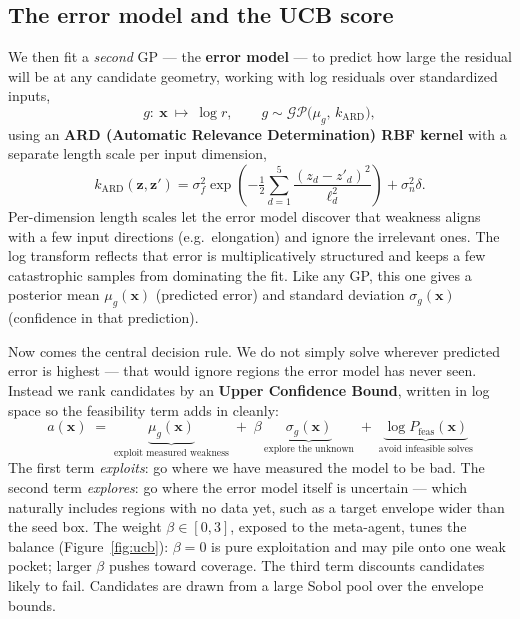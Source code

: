 \documentclass[11pt]{article}
\newcommand{\bx}{\mathbf{x}}
\newcommand{\bz}{\mathbf{z}}
\newcommand{\GP}{\mathcal{GP}}
\begin{document}
\subsection{The error model and the UCB score}
We then fit a \emph{second} GP --- the \textbf{error model} --- to predict how large the residual
will be at any candidate geometry, working with log residuals over standardized inputs,
\begin{equation}
g:\ \bx\ \longmapsto\ \log r,\qquad g\sim\GP\big(\mu_g,\,k_{\text{ARD}}\big),
\end{equation}
using an \textbf{ARD (Automatic Relevance Determination) RBF kernel} with a separate length scale
per input dimension,
\begin{equation}
k_{\text{ARD}}(\bz,\bz')=\sigma_f^2\exp\!\left(-\tfrac{1}{2}\sum_{d=1}^{5}\frac{(z_d-z'_d)^2}{\ell_d^2}\right)+\sigma_n^2\delta .
\end{equation}
Per-dimension length scales let the error model discover that weakness aligns with a few input
directions (e.g.\ elongation) and ignore the irrelevant ones. The log transform reflects that
error is multiplicatively structured and keeps a few catastrophic samples from dominating the fit.
Like any GP, this one gives a posterior mean $\mu_g(\bx)$ (predicted error) and standard deviation
$\sigma_g(\bx)$ (confidence in that prediction).

Now comes the central decision rule. We do not simply solve wherever predicted error is highest ---
that would ignore regions the error model has never seen. Instead we rank candidates by an
\textbf{Upper Confidence Bound}, written in log space so the feasibility term adds in cleanly:
\begin{equation}
\boxed{\ a(\bx) \;=\; \underbrace{\mu_g(\bx)}_{\text{exploit measured weakness}} \;+\; \beta\,\underbrace{\sigma_g(\bx)}_{\text{explore the unknown}} \;+\; \underbrace{\log P_{\text{feas}}(\bx)}_{\text{avoid infeasible solves}}\ }
\end{equation}
The first term \emph{exploits}: go where we have measured the model to be bad. The second term
\emph{explores}: go where the error model itself is uncertain --- which naturally includes regions
with no data yet, such as a target envelope wider than the seed box. The weight $\beta\in[0,3]$,
exposed to the meta-agent, tunes the balance (Figure~\ref{fig:ucb}): $\beta=0$ is pure
exploitation and may pile onto one weak pocket; larger $\beta$ pushes toward coverage. The third
term discounts candidates likely to fail. Candidates are drawn from a large Sobol pool over the
envelope bounds.
\end{document}
